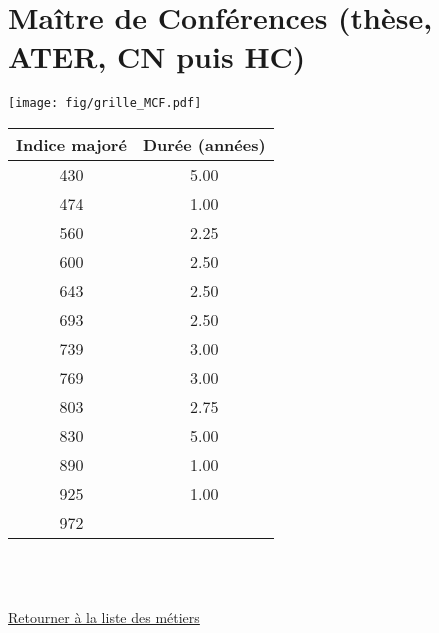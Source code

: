 \newpage 
 
\chapter{Maître de Conférences (thèse, ATER, CN puis HC)} 

\begin{minipage}{0.55\linewidth}\texttt{[image: fig/grille\_MCF.pdf]}\end{minipage} 
\begin{minipage}{0.3\linewidth} 
 \begin{center} 

\begin{tabular}[htb]{|c|c|} 
\hline 
 Indice majoré &  Durée (années) \\ 
\hline \hline 
 430 &  5.00 \\ 
\hline 
 474 &  1.00 \\ 
\hline 
 560 &  2.25 \\ 
\hline 
 600 &  2.50 \\ 
\hline 
 643 &  2.50 \\ 
\hline 
 693 &  2.50 \\ 
\hline 
 739 &  3.00 \\ 
\hline 
 769 &  3.00 \\ 
\hline 
 803 &  2.75 \\ 
\hline 
 830 &  5.00 \\ 
\hline 
 890 &  1.00 \\ 
\hline 
 925 &  1.00 \\ 
\hline 
 972 &   \\ 
\hline 
\hline 
\end{tabular} 
\end{center} 
 \end{minipage} 

~\\ 
 


   
 \localtableofcontents 

~\\ 
 
 \hyperlink{page.2}{\noindent Retourner à la liste des métiers}

